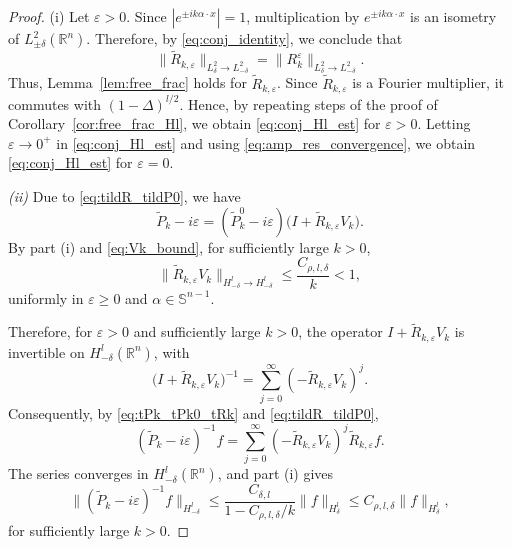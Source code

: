 \documentclass[12pt,a4paper]{amsart}
\numberwithin{equation}{section}
\theoremstyle{plain}
\theoremstyle{definition}
\begin{document}
\begin{proof}
(i) Let $\varepsilon>0$. Since $|e^{\pm ik\alpha\cdot x}|=1$, multiplication by $e^{\pm ik\alpha\cdot x}$
is an isometry of $L^2_{\pm\delta}(\mathbb{R}^n)$. Therefore, by \eqref{eq:conj_identity}, we conclude that
\begin{equation*}
    \|\widetilde{R}_{k,\varepsilon}\|_{L^2_\delta\to L^2_{-\delta}} = \|R^\varepsilon_k\|_{L^2_\delta\to L^2_{-\delta}}.
\end{equation*}
Thus, Lemma~\ref{lem:free_frac}
holds for $\widetilde{R}_{k,\varepsilon}$. Since
$\widetilde{R}_{k,\varepsilon}$ is a Fourier multiplier, it commutes with
$(1-\Delta)^{l/2}$. Hence, by repeating steps of the proof of Corollary~\ref{cor:free_frac_Hl}, we obtain \eqref{eq:conj_Hl_est} for $\varepsilon>0$. 
Letting $\varepsilon\to0^+$ in \eqref{eq:conj_Hl_est} and using
\eqref{eq:amp_res_convergence}, we obtain \eqref{eq:conj_Hl_est}
for $\varepsilon=0$.

\emph{(ii)} Due to \eqref{eq:tildR_tildP0}, we have
\begin{equation}\label{eq:tPk_tPk0_tRk}
    \widetilde P_k-i\varepsilon
    =
    (\widetilde P_k^0-i\varepsilon)
    \bigl(I+\widetilde R_{k,\varepsilon}V_k\bigr).
\end{equation}
By part (i) and \eqref{eq:Vk_bound}, for sufficiently large $k>0$,
\begin{equation*}
    \|\widetilde R_{k,\varepsilon}V_k\|_{H^l_{-\delta}\to H^l_{-\delta}}
    \leq
    \frac{C_{\rho,l,\delta}}{k}<1,
\end{equation*}
uniformly in $\varepsilon\geq0$ and
$\alpha\in\mathbb S^{n-1}$.

Therefore, for $\varepsilon>0$ and sufficiently large $k>0$,
the operator $I+\widetilde R_{k,\varepsilon}V_k$ is invertible on
$H^l_{-\delta}(\mathbb R^n)$, with
\[
\bigl(I+\widetilde R_{k,\varepsilon}V_k\bigr)^{-1}
=
\sum_{j=0}^\infty
(-\widetilde R_{k,\varepsilon}V_k)^j.
\]
Consequently, by \eqref{eq:tPk_tPk0_tRk} and \eqref{eq:tildR_tildP0},
\begin{equation}\label{eq:conj_neumann}
(\widetilde P_k-i\varepsilon)^{-1}f
=
\sum_{j=0}^\infty
(-\widetilde R_{k,\varepsilon}V_k)^j
\widetilde R_{k,\varepsilon}f.
\end{equation}
The series converges in $H^l_{-\delta}(\mathbb R^n)$, and part (i) gives
\[
\|(\widetilde P_k-i\varepsilon)^{-1}f\|_{H^l_{-\delta}}
\leq
\frac{C_{\delta,l}}
{1-C_{\rho,l,\delta}/k}
\|f\|_{H^l_\delta}
\leq
C_{\rho,l,\delta}\|f\|_{H^l_\delta},
\]
for sufficiently large $k>0$.


\end{proof}
\end{document}
